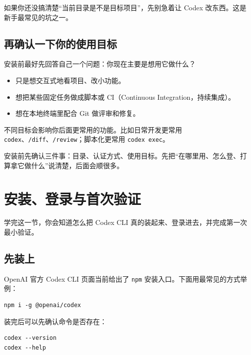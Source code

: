 \documentclass[UTF8,a4paper,12pt]{ctexart}
\begin{document}
\begin{warnbox}
如果你还没搞清楚“当前目录是不是目标项目”，先别急着让 Codex 改东西。这是新手最常见的坑之一。
\end{warnbox}

\subsection{再确认一下你的使用目标}

安装前最好先回答自己一个问题：你现在主要是想用它做什么？
\begin{itemize}
  \item 只是想交互式地看项目、改小功能。
  \item 想把某些固定任务做成脚本或 CI（Continuous Integration，持续集成）。
  \item 想在本地终端里配合 Git 做评审和修复。
\end{itemize}

不同目标会影响你后面更常用的功能。比如日常开发更常用 \texttt{codex}、\texttt{/diff}、\texttt{/review}；脚本化更常用 \texttt{codex exec}。

\begin{sumbox}
安装前先确认三件事：目录、认证方式、使用目标。先把“在哪里用、怎么登、打算拿它做什么”说清楚，后面会顺很多。
\end{sumbox}

\section{安装、登录与首次验证}

\begin{learnbox}
学完这一节，你会知道怎么把 Codex CLI 真的装起来、登录进去，并完成第一次最小验证。
\end{learnbox}

\subsection{先装上}

OpenAI 官方 Codex CLI 页面当前给出了 \texttt{npm} 安装入口。下面用最常见的方式举例：

\begin{lstlisting}[style=cli]
npm i -g @openai/codex
\end{lstlisting}

装完后可以先确认命令是否存在：

\begin{lstlisting}[style=cli]
codex --version
codex --help
\end{lstlisting}
\end{document}
